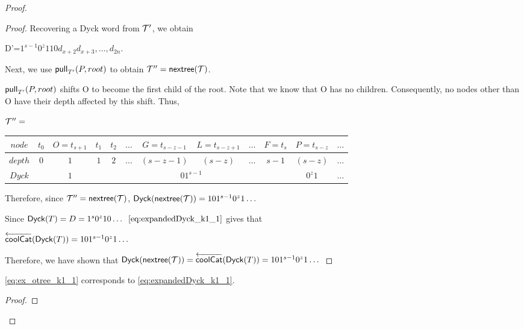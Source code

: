 \begin{proof}
\begin{proof}

    Recovering a Dyck word from $\tree{T}'$, we obtain 

    D'=$1^{s-1}0^z110d_{x+2}d_{x+3},\dots,d_{2n}$.


    Next, we use $\poppush[T']{P}{root}$
 to obtain $\tree{T}'' = \nextTree{T}$.

    $\poppush[T']{P}{root}$
 shifts O to become the first child of the root. Note that we know that O has no children. Consequently, no nodes other than O have their depth affected by this shift. Thus, 

    \bigskip
    \bigskip


    $\tree{T}''=$
    \begin{center}
	\begin{tabular}{ |c|c|c|c|c|c|c|c|c|c|c|c| } 
	    \hline

	    $node$ & $t_0$ & $O=t_{s+1}$ & $t_1$ & $t_2$ & $\dots$ & $G=t_{s-z-1}$ & $L=t_{s-z+1}$ & $\dots$ & $F=t_s$ & $P=t_{s-z}$ & $\dots$ \\
	    \hline
	    $depth$ & $0$ & $1$ & $1$ & $2$ &$\dots$ & $(s-z-1)$ & $(s-z)$ & $\dots$ & $s-1$ & $(s-z)$   & $\dots$\\
	    \hline
	    $Dyck$ &  & $1$ &  \multicolumn{7}{|c|}{$01^{s-1}$} &  $0^{z}1$   & $\dots$\\
	    \hline
	\end{tabular}
    \end{center}


    \bigskip
    \bigskip




    Therefore, since $\tree{T}''=\nextTree{T}$, $\dyck{\nextTree{T}}=101^{s-1}0^z1\dots$

    Since $\dyck{T}=D=1^s0^{z}10\dots$
    $\eqref{eq:expandedDyck_k1_1}$ gives that

    $\coolCat{\dyck{T}}=101^{s-1}0^z1\dots$

    Therefore, we have shown that $\dyck{\nextTree{T}}=\coolCat{\dyck{T}}=101^{s-1}0^z1\dots$

\end{proof}
\begin{lemma}
    \eqref{eq:ex_otree_k1_1} corresponds to \eqref{eq:expandedDyck_k1_1}.
\end{lemma}
\begin{proof}


\end{proof}
\end{proof}
